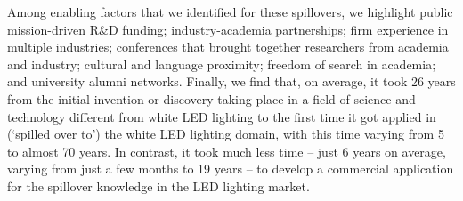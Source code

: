\documentclass[parskip=full]{article}
\begin{document}
Among enabling factors that we identified for these spillovers, we highlight public mission-driven R\&D funding; industry-academia partnerships; firm experience in multiple industries; conferences that brought together researchers from academia and industry; cultural and language proximity; freedom of search in academia; and university alumni networks.
Finally, we find that, on average, it took 26 years from the initial invention or discovery taking place in a field of science and technology different from white LED lighting to the first time it got applied in (‘spilled over to’) the white LED lighting domain, with this time varying from 5 to almost 70 years. In contrast, it took much less time – just 6 years on average, varying from just a few months to 19 years – to develop a commercial application for the spillover knowledge in the LED lighting market.
\end{document}
